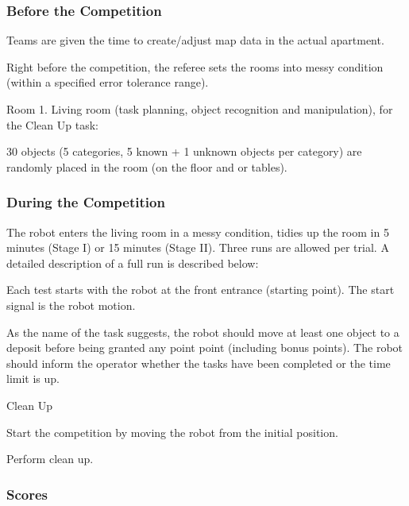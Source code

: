 \documentclass{article}
\newcommand{\SubItem}[1]{
    {\setlength\itemindent{15pt} \item[-] #1}
}
\begin{document}
\subsubsection{Before the Competition}

\begin{itemize}
    \item Teams are given the time to create/adjust map data in the actual apartment.
    \item Right before the competition, the referee sets the rooms into messy condition (within a specified error tolerance range).
    \item Room 1. Living room (task planning, object recognition and manipulation), for the Clean Up task:
        \SubItem{30 objects (5 categories, 5 known + 1 unknown objects per category) are randomly placed in the room (on the floor and or tables).}
\end{itemize}

\subsubsection{During the Competition}

The robot enters the living room in a messy condition, tidies up the room in 5 minutes (Stage I) or 15 minutes (Stage II). Three runs are allowed per trial. A detailed description of a full run is described below:

\begin{itemize}
    \item Each test starts with the robot at the front entrance (starting point). The start signal is the robot motion.
    \item As the name of the task suggests, the robot should move at least one object to a deposit before being granted any point point (including bonus points). The robot should inform the operator whether the tasks have been completed or the time limit is up.
    \item Clean Up
        \SubItem{Start the competition by moving the robot from the initial position.}
        \SubItem{Perform clean up.}
\end{itemize}

\subsubsection{Scores} \label{sec:scores}
\end{document}
